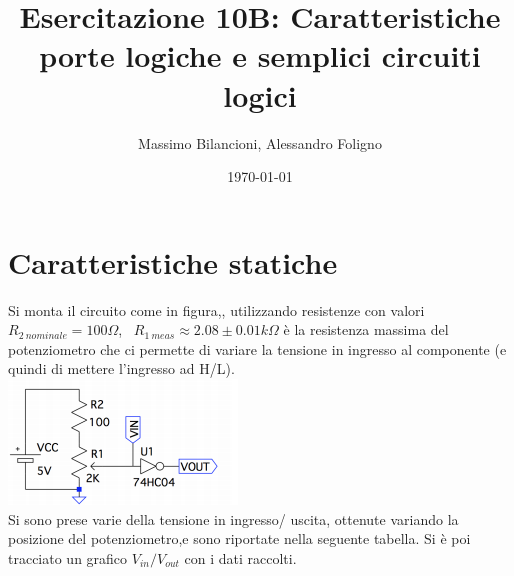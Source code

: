 \documentclass[10pt,a4paper]{article}
\date{\today}
\title{Esercitazione 10B: Caratteristiche porte logiche e semplici circuiti logici}
\author{Massimo Bilancioni, Alessandro Foligno}
\begin{document}
	
\maketitle
	
	\section{Caratteristiche statiche}
	Si monta il circuito come in figura,, utilizzando resistenze con valori  $R_{2~nominale}=100\Omega $,~
	$R_{1~meas}\approx2.08\pm0.01 k \Omega$ è la resistenza massima del potenziometro che ci permette di variare la tensione in ingresso al componente (e quindi di mettere l'ingresso ad H/L).\\
	\includegraphics[scale=0.9]{Cattura.png}\centering
\\Si sono prese varie della tensione in ingresso/ uscita,  ottenute variando la posizione del potenziometro,e sono riportate nella seguente tabella. Si è poi tracciato un grafico $V_{in}/V_{out}$ con i dati raccolti. \\
	
\end{document}
